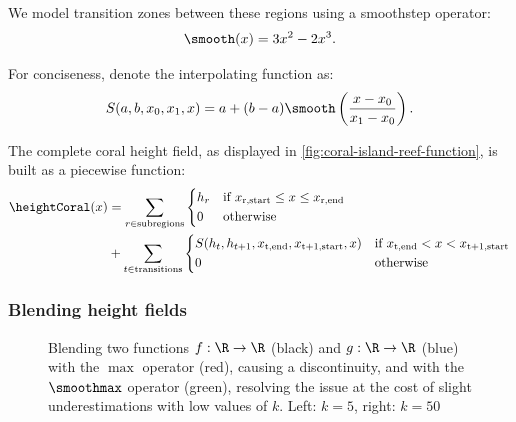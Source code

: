 We model transition zones between these regions using a smoothstep operator:
\begin{align}
\smooth(x) = 3x^2 - 2x^3.
\end{align}

For conciseness, denote the interpolating function as:
\begin{align}
S(a, b, x_0, x_1, x) = a + (b-a) \smooth\left(\frac{x - x_0}{x_1 - x_0}\right).
\end{align}

The complete coral height field, as displayed in \cref{fig:coral-island-reef-function}, is built as a piecewise function:
\begin{align}
\label{eq:coral-island-full-reef-function}
\heightCoral(x) &= \sum_{r \in \text{subregions}}{
\begin{dcases}
h_r & \text{if } x_{\text{r,start}} \leq x \leq x_{\text{r,end}} \\
0 & \text{otherwise}
\end{dcases}
} \nonumber \\
&+
\sum_{t \in \text{transitions}} {
\begin{dcases}
S(h_{t}, h_{t+1}, x_{\text{t,end}}, x_{\text{t+1,start}}, x) & \text{if } x_{\text{t,end}} < x < x_{\text{t+1,start}} \\
0 & \text{otherwise}
\end{dcases}
}
\end{align}

\subsubsection{Blending height fields}
\label{subsubsec:height-functions-blending}

\begin{figure}[H]
\caption{Blending two functions $f: \R \to \R$ (black) and $g: \R \to \R$ (blue) with the $\max$ operator (red), causing a discontinuity, and with the $\smoothmax$ operator (green), resolving the issue at the cost of slight underestimations with low values of $k$. Left: $k=5$, right: $k=50$}
\label{fig:coral-island-blend-function-island}
\end{figure}

